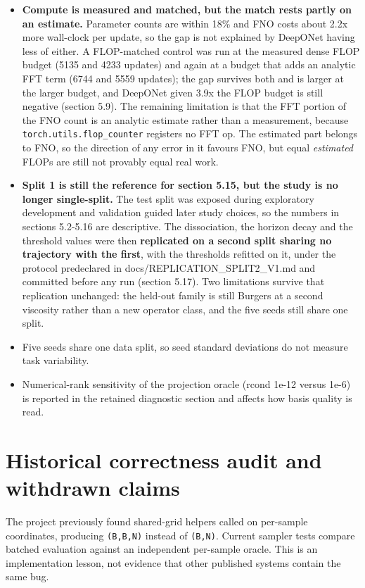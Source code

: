 \documentclass[preprint,12pt]{elsarticle}
\begin{document}
\begin{itemize}
\item \textbf{Compute is measured and matched, but the match rests partly on an estimate.} Parameter counts are within 18\% and FNO costs about 2.2x more wall-clock per update, so the gap is not explained by DeepONet having less of either. A FLOP-matched control was run at the measured dense FLOP budget (5135 and 4233 updates) and again at a budget that adds an analytic FFT term (6744 and 5559 updates); the gap survives both and is larger at the larger budget, and DeepONet given 3.9x the FLOP budget is still negative (section 5.9). The remaining limitation is that the FFT portion of the FNO count is an analytic estimate rather than a measurement, because \texttt{torch.utils.flop\_counter} registers no FFT op. The estimated part belongs to FNO, so the direction of any error in it favours FNO, but equal \emph{estimated} FLOPs are still not provably equal real work.
\item \textbf{Split 1 is still the reference for section 5.15, but the study is no longer single-split.} The test split was exposed during exploratory development and validation guided later study choices, so the numbers in sections 5.2-5.16 are descriptive. The dissociation, the horizon decay and the threshold values were then \textbf{replicated on a second split sharing no trajectory with the first}, with the thresholds refitted on it, under the protocol predeclared in docs/REPLICATION\_SPLIT2\_V1.md and committed before any run (section 5.17). Two limitations survive that replication unchanged: the held-out family is still Burgers at a second viscosity rather than a new operator class, and the five seeds still share one split.
\item Five seeds share one data split, so seed standard deviations do not measure task variability.
\item Numerical-rank sensitivity of the projection oracle (rcond 1e-12 versus 1e-6) is reported in the retained diagnostic section and affects how basis quality is read.
\end{itemize}


\section{Historical correctness audit and withdrawn claims}

The project previously found shared-grid helpers called on per-sample coordinates, producing \texttt{(B,B,N)} instead of \texttt{(B,N)}. Current sampler tests compare batched evaluation against an independent per-sample oracle. This is an implementation lesson, not evidence that other published systems contain the same bug.
\end{document}

